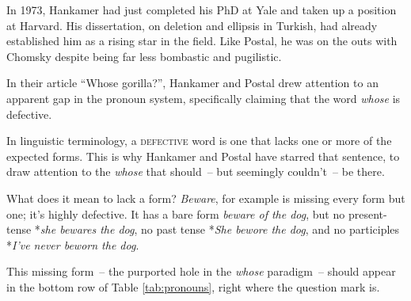 In 1973, Hankamer had just completed his PhD at Yale and taken up a position at Harvard. His dissertation, on deletion and ellipsis in Turkish, had already established him as a rising star in the field. Like Postal, he was on the outs with Chomsky despite being far less bombastic and pugilistic.

In their article ``Whose gorilla?'', Hankamer and Postal drew attention to an apparent gap in the pronoun system, specifically claiming that the word \textit{whose} is defective.

In linguistic terminology, a \textsc{defective} word is one that lacks one or more of the expected forms. This is why Hankamer and Postal have starred that sentence, to draw attention to the \textit{whose} that should~-- but seemingly couldn't~-- be there. 

What does it mean to lack a form? \textit{Beware}, for example is missing every form but one; it's highly defective. It has a bare form \textit{beware of the dog}, but no present-tense *\textit{she bewares the dog}, no past tense *\textit{She bewore the dog}, and no participles *\textit{I've never beworn the dog}.

This missing form~-- the purported hole in the \textit{whose} paradigm~-- should appear in the bottom row of Table \ref{tab:pronouns}, right where the question mark is.

